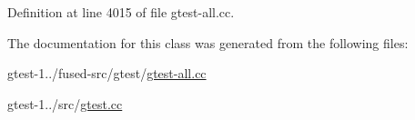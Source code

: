 \-Definition at line 4015 of file gtest-\/all.\-cc.



\-The documentation for this class was generated from the following files\-:\begin{DoxyCompactItemize}
\item 
gtest-\/1../fused-\/src/gtest/\hyperlink{fused-src_2gtest_2gtest-all_8cc}{gtest-\/all.\-cc}\item 
gtest-\/1../src/\hyperlink{gtest_8cc}{gtest.\-cc}\end{DoxyCompactItemize}
